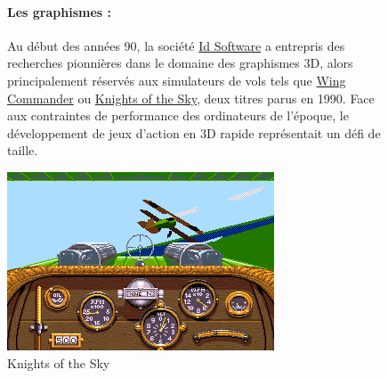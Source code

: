 \documentclass[12pt]{report}
\begin{document}
\begin{figure}[H]
    \begin{minipage}{0.48\textwidth}
        \paragraph{Les graphismes : }
		Au début des années 90, la société \href{https://fr.wikipedia.org/wiki/Id_Software}{Id Software} a entrepris des 
		recherches pionnières dans le domaine des graphismes 3D, alors principalement réservés aux simulateurs de vols tels 
		que \href{https://fr.wikipedia.org/wiki/Wing_Commander_(jeu_vid%C3%A9o)}{Wing Commander} ou 
		\href{https://en.wikipedia.org/wiki/Knights_of_the_Sky}{Knights of the Sky}, deux titres parus en 1990. Face aux 
		contraintes de performance des ordinateurs de l'époque, le développement de jeux d'action en 3D rapide représentait 
		un défi de taille. 
    \end{minipage}\hfill
    \begin{minipage}{0.48\textwidth}
        \centering
        \includegraphics[width=\linewidth]{image/knights-of-the-sky.png}
        \caption{Knights of the Sky}
        \label{fig:knights-of-the-sky}
    \end{minipage}
\end{figure}
\end{document}
